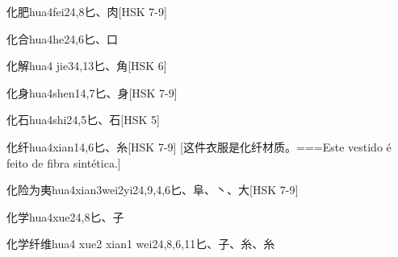 \begin{EntryWithPhonetic}{化肥}{hua4fei2}{4,8}{⼔、⾁}[HSK 7-9]
\end{EntryWithPhonetic}

\begin{EntryWithPhonetic}{化合}{hua4he2}{4,6}{⼔、⼝}
\end{EntryWithPhonetic}

\begin{EntryWithPhonetic}{化解}{hua4 jie3}{4,13}{⼔、⾓}[HSK 6]
\end{EntryWithPhonetic}

\begin{EntryWithPhonetic}{化身}{hua4shen1}{4,7}{⼔、⾝}[HSK 7-9]
\end{EntryWithPhonetic}

\begin{EntryWithPhonetic}{化石}{hua4shi2}{4,5}{⼔、⽯}[HSK 5]
\end{EntryWithPhonetic}

\begin{EntryWithPhonetic}{化纤}{hua4xian1}{4,6}{⼔、⽷}[HSK 7-9]
  [这件衣服是化纤材质。===Este vestido é feito de fibra sintética.]
\end{EntryWithPhonetic}

\begin{EntryWithPhonetic}{化险为夷}{hua4xian3wei2yi2}{4,9,4,6}{⼔、⾩、⼂、⼤}[HSK 7-9]
\end{EntryWithPhonetic}

\begin{EntryWithPhonetic}{化学}{hua4xue2}{4,8}{⼔、⼦}
\end{EntryWithPhonetic}

\begin{EntryWithPhonetic}{化学纤维}{hua4 xue2 xian1 wei2}{4,8,6,11}{⼔、⼦、⽷、⽷}
\end{EntryWithPhonetic}

